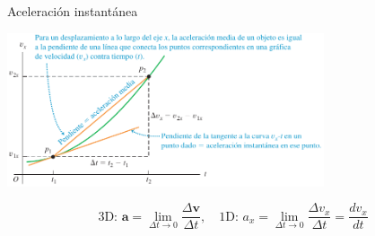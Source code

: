 \documentclass[9pt, aspectratio=169]{beamer}
\begin{document}
\begin{frame}{Aceleración instantánea}
    \begin{center}
        \includegraphics[width=0.7\textwidth]{figs/a_instantanea.png}
    \end{center}
    \[ \text{3D: } \bm{a} = \lim_{\Delta t \rightarrow 0} \frac{\Delta \bm{v}}{\Delta t}, \quad \text{1D: } a_x = \lim_{\Delta t \rightarrow 0} \frac{\Delta v_x}{\Delta t} = \frac{dv_x}{dt} \]
\end{frame}
\end{document}
